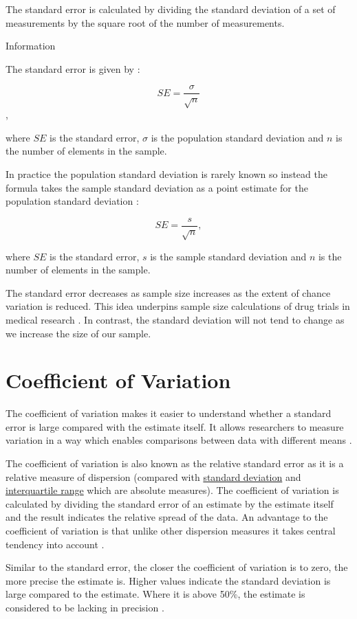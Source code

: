 \documentclass[
]{book}
\begin{document}
The standard error is calculated by dividing the standard deviation of a set of measurements by the square root of the number of measurements.

Information

The standard error is given by \citep{uncertainty}:

\[SE=\frac{\sigma}{\sqrt{n}}\],

where \(SE\) is the standard error, \(\sigma\) is the population standard deviation and \(n\) is the number of elements in the sample.

In practice the population standard deviation is rarely known so instead the formula takes the sample standard deviation as a point estimate for the population standard deviation \citep{uncertainty}:

\[SE=\frac{s}{\sqrt{n}},\]

where \(SE\) is the standard error, \(s\) is the sample standard deviation and \(n\) is the number of elements in the sample.

The standard error decreases as sample size increases as the extent of chance variation is reduced. This idea underpins sample size calculations of drug trials in medical research \citep{bmj}. In contrast, the standard deviation will not tend to change as we increase the size of our sample.

\hypertarget{coeff}{%
\section{Coefficient of Variation}\label{coeff}}

The coefficient of variation makes it easier to understand whether a standard error is large compared with the estimate itself. It allows researchers to measure variation in a way which enables comparisons between data with different means \citep{davidandgray}.

The coefficient of variation is also known as the relative standard error as it is a relative measure of dispersion (compared with \protect\hyperlink{stdv}{standard deviation} and \protect\hyperlink{iqr}{interquartile range} which are absolute measures). The coefficient of variation is calculated by dividing the standard error of an estimate by the estimate itself and the result indicates the relative spread of the data. An advantage to the coefficient of variation is that unlike other dispersion measures it takes central tendency into account \citep{davidandgray}.

Similar to the standard error, the closer the coefficient of variation is to zero, the more precise the estimate is. Higher values indicate the standard deviation is large compared to the estimate. Where it is above 50\%, the estimate is considered to be lacking in precision \citep{uncertainty}.
\end{document}
